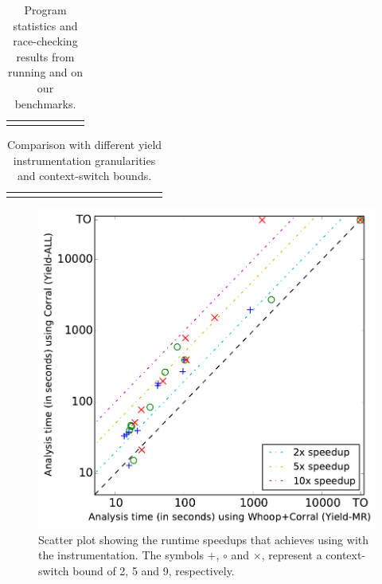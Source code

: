 \newcommand{\colspacing}{\hspace{1.8em}}
\begin{table}[t]
\small
\centering
\setlength{\tabcolsep}{0.3em}
\caption{Program statistics and race-checking results from running \whoop and \corral on our benchmarks.}
\label{tab:stats}
\begin{tabular}{l rrr rr r}
\centering

\end{tabular}
\end{table}

\begin{table}[t]
\small
\centering
\setlength{\tabcolsep}{0.45em}
\caption{Comparison with different yield instrumentation granularities and context-switch bounds.}
\label{tab:results}
\begin{tabular}{l r rrrr rrrr rrrr}
\centering

\end{tabular}
\end{table}

\begin{figure}
\centering
\includegraphics[width=.99\linewidth]{experiments/figures/yieldmr_vs_yieldall.pdf}
\caption{Scatter plot showing the runtime speedups that \corral achieves using \whoop with the \yieldmr instrumentation. The symbols $+$, $\circ$ and $\times$, represent a context-switch bound of 2, 5 and 9, respectively.}
\label{fig:plot}
\end{figure}

